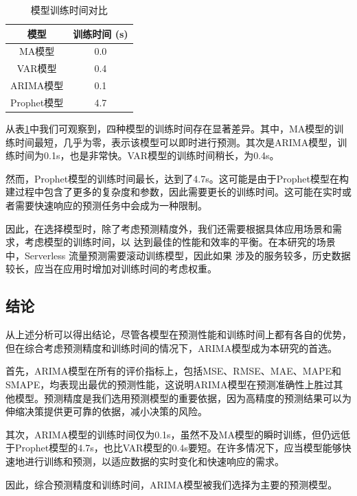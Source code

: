 \documentclass[a4paper,AutoFakeBold,oneside,12pt]{book}
\begin{document}
\begin{table}[h]
    \centering
    \caption{模型训练时间对比}
    \label{table:model_training_time_comparison}
    \begin{tabular}{c|c}
        \hline
        \textbf{模型} & \textbf{训练时间 (s)} \\
        \hline
        MA模型 & 0.0 \\
        VAR模型 & 0.4 \\
        ARIMA模型 & 0.1 \\
        Prophet模型 & 4.7 \\
        \hline
    \end{tabular}
\end{table}

从表\ref{table:model_training_time_comparison}中我们可观察到，四种模型的训练时间存在显著差异。其中，MA模型的训练时间最短，几乎为零，表示该模型可以即时进行预测。其次是ARIMA模型，训练时间为0.1s，也是非常快。VAR模型的训练时间稍长，为0.4s。

然而，Prophet模型的训练时间最长，达到了4.7s。这可能是由于Prophet模型在构建过程中包含了更多的复杂度和参数，因此需要更长的训练时间。这可能在实时或者需要快速响应的预测任务中会成为一种限制。

因此，在选择模型时，除了考虑预测精度外，我们还需要根据具体应用场景和需求，考虑模型的训练时间，以
达到最佳的性能和效率的平衡。在本研究的场景中，Serverless 流量预测需要滚动训练模型，因此如果
涉及的服务较多，历史数据较长，应当在应用时增加对训练时间的考虑权重。


\subsection{结论}

从上述分析可以得出结论，尽管各模型在预测性能和训练时间上都有各自的优势，但在综合考虑预测精度和训练时间的情况下，ARIMA模型成为本研究的首选。

首先，ARIMA模型在所有的评价指标上，包括MSE、RMSE、MAE、MAPE和SMAPE，均表现出最优的预测性能，这说明ARIMA模型在预测准确性上胜过其他模型。预测精度是我们选用预测模型的重要依据，因为高精度的预测结果可以为伸缩决策提供更可靠的依据，减小决策的风险。

其次，ARIMA模型的训练时间仅为0.1s，虽然不及MA模型的瞬时训练，但仍远低于Prophet模型的4.7s，也比VAR模型的0.4s要短。在许多情况下，应当模型能够快速地进行训练和预测，以适应数据的实时变化和快速响应的需求。

因此，综合预测精度和训练时间，ARIMA模型被我们选择为主要的预测模型。
\end{document}
